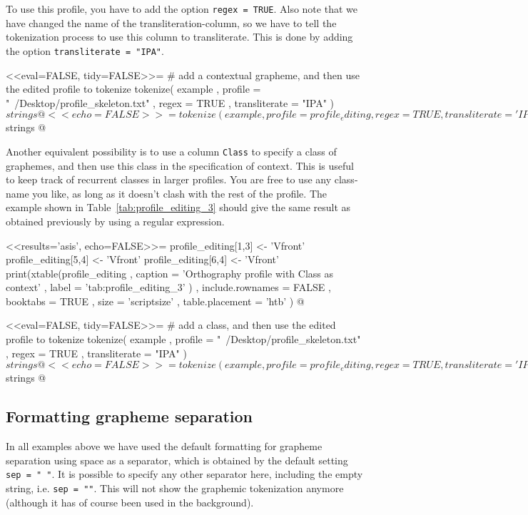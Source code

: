 To use this profile, you have to add the option \texttt{regex = TRUE}. Also note
that we have changed the name of the transliteration-column, so we have to tell
the tokenization process to use this column to transliterate. This is done by
adding the option \texttt{transliterate = "IPA"}.

<<eval=FALSE, tidy=FALSE>>=
# add a contextual grapheme, and then use the edited profile to tokenize
tokenize( example
         , profile = "~/Desktop/profile_skeleton.txt"
         , regex = TRUE
         , transliterate = "IPA"
        )$strings
@

<<echo=FALSE>>=
tokenize(example
  , profile = profile_editing
  , regex = TRUE
  , transliterate = 'IPA'
  )$strings
@

Another equivalent possibility is to use a column \texttt{Class} to specify a
class of graphemes, and then use this class in the specification of context.
This is useful to keep track of recurrent classes in larger profiles. You are
free to use any class-name you like, as long as it doesn't clash with the rest
of the profile. The example shown in Table~\ref{tab:profile_editing_3} should 
give the same result as obtained previously by using a regular expression.

<<results='asis', echo=FALSE>>=
profile_editing[1,3] <- 'Vfront'
profile_editing[5,4] <- 'Vfront'
profile_editing[6,4] <- 'Vfront'
print(xtable(profile_editing
        , caption = 'Orthography profile with Class as context'
        , label = 'tab:profile_editing_3'
        )
  , include.rownames = FALSE
  , booktabs = TRUE
  , size = 'scriptsize'
  , table.placement = 'htb'
  )
@

<<eval=FALSE, tidy=FALSE>>=
# add a class, and then use the edited profile to tokenize
tokenize( example
         , profile = "~/Desktop/profile_skeleton.txt"
         , regex = TRUE
         , transliterate = "IPA"
        )$strings
@

<<echo=FALSE>>=
tokenize(example
  , profile = profile_editing
  , regex = TRUE
  , transliterate = 'IPA'
  )$strings
@

\subsection*{Formatting grapheme separation}
\label{formattingseparation}

In all examples above we have used the default formatting for grapheme
separation using space as a separator, which is obtained by the default setting
\texttt{sep~=~"~"}. It is possible to specify any other separator here,
including the empty string, i.e. \texttt{sep = ""}. This will not show the
graphemic tokenization anymore (although it has of course been used in the
background).

